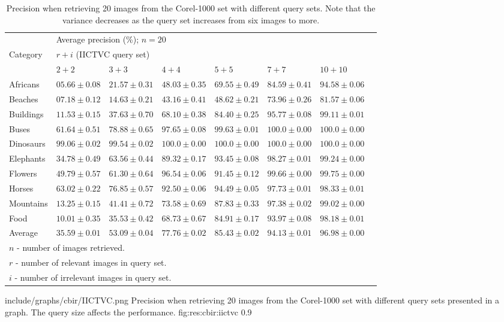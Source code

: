 \begin{table}	
\centering
\begin{scriptsize}
\begin{tabular}{l l l l l l l l}		
\hline					
 					 		& \multicolumn{6}{l}{Average precision (\%); $n=20$} \\ 
\cline{2-7}
Category 			 		&   \multicolumn{6}{l}{$r+i$ (IICTVC query set)} \\
 							& 	$2+2$  			&	$3+3$  			&	$4+4$  			&	$5+5$  			&	$7+7$  			&	$10+10$	\\ 
\hline
Africans		 			&	$05.66\pm0.08 $ &	$21.57\pm0.31 $ &	$48.03\pm0.35 $ &	$69.55\pm0.49 $ &	$84.59\pm0.41 $ &	$94.58\pm0.06 $	\\
Beaches 					&	$07.18\pm0.12 $ &	$14.63\pm0.21 $ &	$43.16\pm0.41 $ &	$48.62\pm0.21 $ &	$73.96\pm0.26 $ &	$81.57\pm0.06 $	\\
Buildings 					&	$11.53\pm0.15 $ &	$37.63\pm0.70 $ &	$68.10\pm0.38 $ &	$84.40\pm0.25 $ &	$95.77\pm0.08 $ &	$99.11\pm0.01 $	\\
Buses 					 	&	$61.64\pm0.51 $ &	$78.88\pm0.65 $ &	$97.65\pm0.08 $ &	$99.63\pm0.01 $ &	$100.0\pm0.00 $ &	$100.0\pm0.00 $	\\
Dinosaurs 					&	$99.06\pm0.02 $ &	$99.54\pm0.02 $ &	$100.0\pm0.00 $ &	$100.0\pm0.00 $ & 	$100.0\pm0.00 $ &	$100.0\pm0.00 $	\\
Elephants 					&	$34.78\pm0.49 $ &	$63.56\pm0.44 $ &	$89.32\pm0.17 $ &	$93.45\pm0.08 $ &	$98.27\pm0.01 $ &	$99.24\pm0.00 $	\\
Flowers 					&	$49.79\pm0.57 $ &	$61.30\pm0.64 $ &	$96.54\pm0.06 $ &	$91.45\pm0.12 $ &	$99.66\pm0.00 $ &	$99.75\pm0.00 $	\\
Horses 						&	$63.02\pm0.22 $ &	$76.85\pm0.57 $ &	$92.50\pm0.06 $ &	$94.49\pm0.05 $ &	$97.73\pm0.01 $ &	$98.33\pm0.01 $	\\
Mountains 					&	$13.25\pm0.15 $ &	$41.41\pm0.72 $ &	$73.58\pm0.69 $ &	$87.83\pm0.33 $ &	$97.38\pm0.02 $ &	$99.02\pm0.00 $	\\
Food 						&	$10.01\pm0.35 $ &	$35.53\pm0.42 $ &	$68.73\pm0.67 $ &	$84.91\pm0.17 $ &	$93.97\pm0.08 $ &	$98.18\pm0.01 $	\smallskip\\ 
Average						&	$35.59\pm0.01 $ &	$53.09\pm0.04 $ &	$77.76\pm0.02 $ &	$85.43\pm0.02 $  &	$94.13\pm0.01 $ &	$96.98\pm0.00 $ \\ 
\hline
\multicolumn{7}{l}{$n$ - number of images retrieved.}\\
\multicolumn{7}{l}{$r$ - number of relevant images in query set.}\\
\multicolumn{7}{l}{$i$ - number of irrelevant images in query set.}
\end{tabular}							
\end{scriptsize}
\caption{Precision when retrieving 20 images from the Corel-1000 set with different query sets. Note that the variance decreases as the query set increases from six images to more.}
\label{table:res:cbir:prec20}
\end{table}							
\singlefigurenear
{include/graphs/cbir/IICTVC.png}
{Precision when retrieving 20 images from the Corel-1000 set with different query sets presented in a graph. The query size affects the performance.}
{fig:res:cbir:iictvc}
{0.9}

